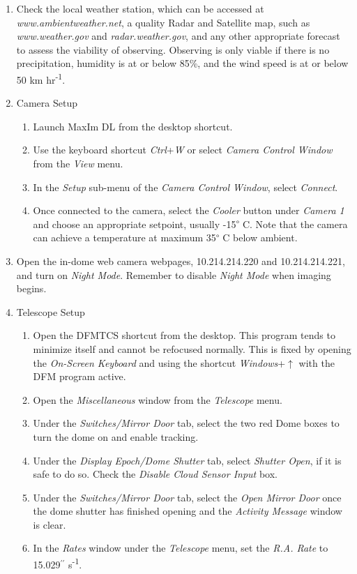 \documentclass[letterpaper,12pt]{article}
\begin{document}
\begin{enumerate}
		\item Check the local weather station, which can be accessed at \textit{www.ambientweather.net}, a quality Radar and Satellite map, such as \textit{www.weather.gov} and \textit{radar.weather.gov}, and any other appropriate forecast to assess the viability of observing. Observing is only viable if there is no precipitation, humidity is at or below 85\%, and the wind speed is at or below 50 km hr\textsuperscript{-1}.
		\item Camera Setup
		\begin{enumerate}
			\item Launch MaxIm DL from the desktop shortcut.
			\item Use the keyboard shortcut \textit{Ctrl}+\textit{W} or select \textit{Camera Control Window} from the \textit{View} menu.
			\item In the \textit{Setup} sub-menu of the \textit{Camera Control Window}, select \textit{Connect}.
			\item Once connected to the camera, select the \textit{Cooler} button under \textit{Camera 1} and choose an appropriate setpoint, usually -15\textsuperscript{$\circ$} C. Note that the camera can achieve a temperature at maximum 35\textsuperscript{$\circ$} C below ambient.
		\end{enumerate}
		\item Open the in-dome web camera webpages, 10.214.214.220 and 10.214.214.221, and turn on \textit{Night Mode}. Remember to disable \textit{Night Mode} when imaging begins.
		\item Telescope Setup
		\begin{enumerate}
			\item Open the DFMTCS shortcut from the desktop. This program tends to minimize itself and cannot be refocused normally. This is fixed by opening the \textit{On-Screen Keyboard} and using the shortcut \textit{Windows}+$\uparrow$ with the DFM program active.
			\item Open the \textit{Miscellaneous} window from the \textit{Telescope} menu.
			\item Under the \textit{Switches/Mirror Door} tab, select the two red Dome boxes to turn the dome on and enable tracking.
			\item Under the \textit{Display Epoch/Dome Shutter} tab, select \textit{Shutter Open}, if it is safe to do so. Check the \textit{Disable Cloud Sensor Input} box.
			\item Under the \textit{Switches/Mirror Door} tab, select the \textit{Open Mirror Door} once the dome shutter has finished opening and the \textit{Activity Message} window is clear.
			\item In the \textit{Rates} window under the \textit{Telescope} menu, set the \textit{R.A. Rate} to 15.029$^{\prime\prime}$ s\textsuperscript{-1}.
		\end{enumerate}
	\end{enumerate}
	
\end{document}

